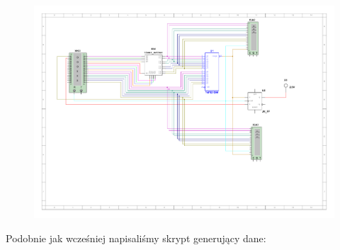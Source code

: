 \documentclass[a4paper]{article}
\begin{document}
\begin{figure}[H]
    \centering
    \includegraphics[width=\textwidth]{component_tests_setter.pdf}
\end{figure}
\pagebreak
Podobnie jak wcześniej napisaliśmy skrypt generujący dane:
\small
\end{document}
